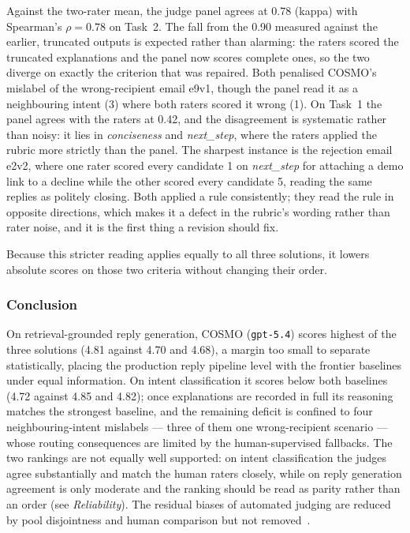 \documentclass[a4paper]{article}
\begin{document}
Against the two-rater mean, the judge panel agrees at 0.78 (kappa) with
Spearman's $\rho = 0.78$ on Task~2. The fall from the 0.90 measured against the
earlier, truncated outputs is expected rather than alarming: the raters scored
the truncated explanations and the panel now scores complete ones, so the two
diverge on exactly the criterion that was repaired. Both penalised COSMO's
mislabel of the wrong-recipient email e9v1, though the panel read it as a
neighbouring intent (3) where both raters scored it wrong (1). On Task~1 the
panel agrees with the raters at 0.42, and the disagreement is systematic rather than noisy: it lies in
\textit{conciseness} and \textit{next\_step}, where the raters applied the
rubric more strictly than the panel. The sharpest instance is the rejection
email e2v2, where one rater scored every candidate 1 on \textit{next\_step}
for attaching a demo link to a decline while the other scored every candidate
5, reading the same replies as politely closing. Both applied a rule
consistently; they read the rule in opposite directions, which makes it a
defect in the rubric's wording rather than rater noise, and it is the first
thing a revision should fix.

Because this stricter reading applies equally to all three solutions, it
lowers absolute scores on those two criteria without changing their order.

\subsubsection{Conclusion}
On retrieval-grounded reply generation, COSMO (\texttt{gpt-5.4}) scores
highest of the three solutions (4.81 against 4.70 and 4.68), a margin too
small to separate statistically, placing the production reply pipeline level
with the frontier baselines under equal information. On intent classification
it scores below both baselines (4.72 against 4.85 and 4.82); once explanations
are recorded in full its reasoning matches the strongest baseline, and the
remaining deficit is confined to four neighbouring-intent mislabels --- three of
them one wrong-recipient scenario --- whose routing consequences are limited by
the human-supervised fallbacks. The two rankings are not equally well
supported: on intent classification the judges agree substantially and match
the human raters closely, while on reply generation agreement is only moderate
and the ranking should be read as parity rather than an order (see
\emph{Reliability}). The residual biases of automated judging are reduced by pool disjointness
and human comparison but not removed~\cite{gu2024survey}.
\end{document}

